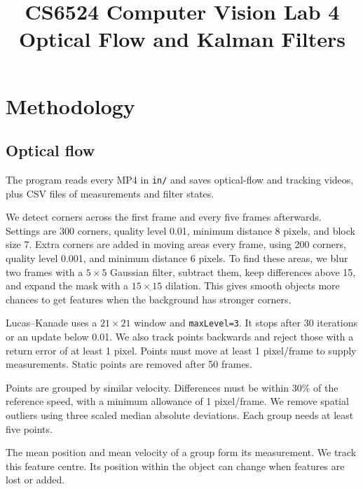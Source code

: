 \documentclass[conference]{assets/latex/IEEEtran}
\begin{document}
\title{CS6524 Computer Vision Lab 4\\Optical Flow and Kalman Filters}
\author{
}
\maketitle
\section{Methodology}
\subsection{Optical flow}
The program reads every MP4 in \texttt{in/} and saves optical-flow and tracking videos, plus CSV files of measurements and filter states.

We detect corners across the first frame and every five frames afterwards. Settings are 300 corners, quality level 0.01, minimum distance 8 pixels, and block size 7. Extra corners are added in moving areas every frame, using 200 corners, quality level 0.001, and minimum distance 6 pixels. To find these areas, we blur two frames with a $5\times5$ Gaussian filter, subtract them, keep differences above 15, and expand the mask with a $15\times15$ dilation. This gives smooth objects more chances to get features when the background has stronger corners.

Lucas--Kanade uses a $21\times21$ window and \texttt{maxLevel=3}. It stops after 30 iterations or an update below 0.01. We also track points backwards and reject those with a return error of at least 1 pixel. Points must move at least 1 pixel/frame to supply measurements. Static points are removed after 50 frames.

Points are grouped by similar velocity. Differences must be within 30\% of the reference speed, with a minimum allowance of 1 pixel/frame. We remove spatial outliers using three scaled median absolute deviations. Each group needs at least five points.

The mean position and mean velocity of a group form its measurement. We track this feature centre. Its position within the object can change when features are lost or added.
\end{document}
